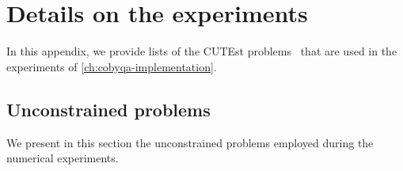 %
%
%
\chapter{Details on the experiments}

In this appendix, we provide lists of the CUTEst problems~\cite{Gould_Orban_Toint_2015} that are used in the experiments of \cref{ch:cobyqa-implementation}.

\section{Unconstrained problems}

We present in this section the unconstrained problems employed during the numerical experiments.

